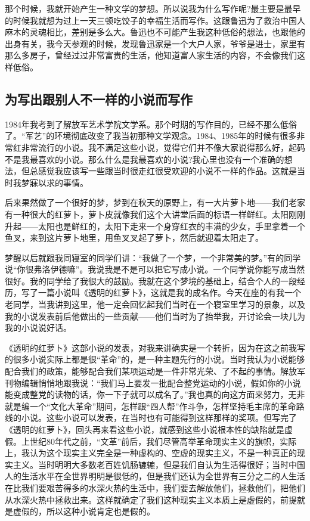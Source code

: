 \documentclass[fontset=fandol,12pt,a5paper]{ctexbook}
\begin{document}
那个时候，我就开始产生一种文学的梦想。所以说我为什么写作呢?最主要是最早的时候我就想为过上一天三顿吃饺子的幸福生活而写作。这跟鲁迅为了救治中国人麻木的灵魂相比，差别是多么大。鲁迅也不可能产生我这种低俗的想法，也跟他的出身有关，我今天参观的时候，发现鲁迅家是一个大户人家，爷爷是进士，家里有那么多房子，曾经过过非常富贵的生活，他知道富人家生活的内容，不会像我们这样低俗。

\subsection{为写出跟别人不一样的小说而写作}

1984年我考到了解放军艺术学院文学系。那个时期的写作目的，已经不那么低俗了。“军艺”的环境彻底改变了我当初那种文学观念。1984、1985年的时候有很多非常红非常流行的小说。我不满足这些小说，觉得它们并不像大家说得那么好，起码不是我最喜欢的小说。那么什么是我最喜欢的小说?我心里也没有一个准确的想法，但总感觉我应该写一些跟当时很走红很受欢迎的小说不一样的作品。这就是当时我梦寐以求的事情。

后来果然做了一个很好的梦，梦到在秋天的原野上，有一大片萝卜地——我们老家有一种很大的红萝卜，萝卜皮就像我们这个大讲堂后面的标语一样鲜红。太阳刚刚升起——太阳也是鲜红的，太阳下走来一个身穿红衣的丰满的少女，手里拿着一个鱼叉，来到这片萝卜地里，用鱼叉叉起了萝卜，然后就迎着太阳走了。

梦醒以后就跟我同寝室的同学们讲：“我做了一个梦，一个非常美的梦。”有的同学说“你很弗洛伊德嘛”。我说我是不是可以把它写成小说。一个同学说你能写成当然很好。我的同学给了我很大的鼓励。我就在这个梦境的基础上，结合个人的一段经历，写了一篇小说叫《透明的红萝卜》，这就是我的成名作。今天在座的有我一个老同学，当我讲到这里，他一定会回忆起我们当时在一个寝室里学习的景象，以及我的小说发表前后他做出的一些贡献——他们当时为了抬举我，开讨论会一块儿为我的小说说好话。

《透明的红萝卜》这部小说的发表，对我来讲确实是一个转折，因为在这之前我写的很多小说实际上都是很“革命”的，是一种主题先行的小说。当时我认为小说能够配合我们的政策，能够配合我们某项运动是一件非常光荣、了不起的事情。解放军刊物编辑悄悄地跟我说：“我们马上要发一批配合整党运动的小说，假如你的小说能变成整党的读物的话，你一下子就可以成名了。”我也真的向这方面来努力，无非就是编一个“文化大革命”期间，怎样跟“四人帮”作斗争，怎样坚持毛主席的革命路线的小说。这些小说可以发表，在当时也有可能得到这样那样的奖项。但写完了《透明的红萝卜》，回头再来看这些小说，就感到这些小说根本性的缺陷就是虚假。上世纪80年代之前，“文革”前后，我们尽管高举革命现实主义的旗帜，实际上，我认为这个现实主义完全是一种虚构的、空虚的现实主义，不是一种真正的现实主义。当时明明大多数老百姓饥肠辘辘，但是我们自认为生活得很好；当时中国人的生活水平在全世界明明是很低的，但是我们还认为全世界有三分之二的人生活在比我们要艰苦得多的水深火热的生活中，我们要去解放他们，拯救他们，把他们从水深火热中拯救出来。这样就确定了我们这种现实主义本质上是虚假的，前提就是虚假的，所以这种小说肯定也是假的。
\end{document}
